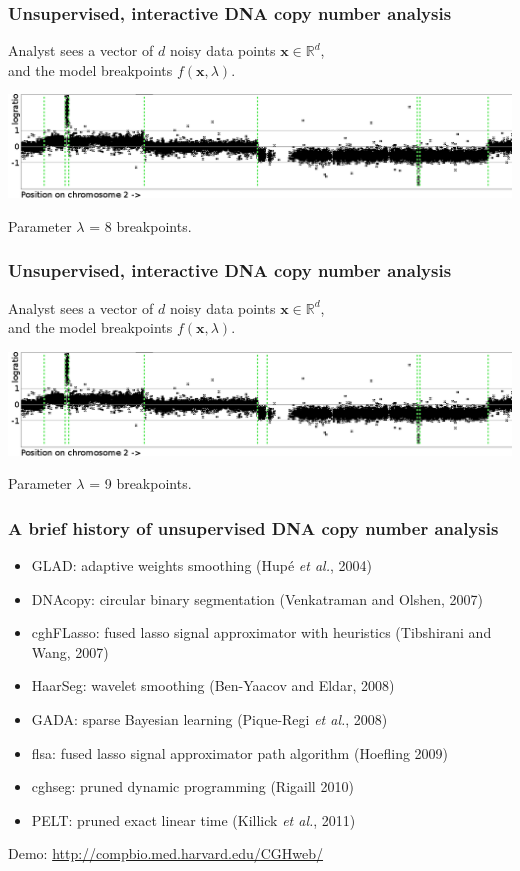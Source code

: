 \documentclass{beamer}
\newcommand{\RR}{\mathbb R}
\begin{document}
\begin{frame}
  \frametitle{Unsupervised, interactive DNA copy number analysis}
  Analyst sees a vector of $d$ noisy data points $\mathbf x\in\RR^d$, \\
  and the model breakpoints $f(\mathbf x, \lambda)$.

  \includegraphics[width=\textwidth]{unlabeled-breakpoints-8}

  Parameter $\lambda$ = 8 breakpoints.
\end{frame}

\begin{frame}
  \frametitle{Unsupervised, interactive DNA copy number analysis}
  Analyst sees a vector of $d$ noisy data points $\mathbf x\in\RR^d$, \\
  and the model breakpoints $f(\mathbf x, \lambda)$.

  \includegraphics[width=\textwidth]{unlabeled-breakpoints-9}

  Parameter $\lambda$ = 9 breakpoints.
\end{frame}

\begin{frame}
  \frametitle{A brief history of unsupervised DNA copy number analysis}
  \begin{itemize}
  \item GLAD: adaptive weights smoothing (Hup\'e \textit{et al.}, 2004)
  \item DNAcopy: circular binary segmentation (Venkatraman and Olshen,
    2007)
  \item cghFLasso: fused lasso signal approximator with heuristics
    (Tibshirani and Wang, 2007)
  \item HaarSeg: wavelet smoothing (Ben-Yaacov and Eldar, 2008)
  \item GADA: sparse Bayesian learning (Pique-Regi \textit{et al.}, 2008)
  \item flsa: fused lasso signal approximator path algorithm (Hoefling 2009)
  \item cghseg: pruned dynamic programming (Rigaill 2010)
  \item PELT: pruned exact linear time (Killick \textit{et al.}, 2011)
  \end{itemize}
  Demo: \url{http://compbio.med.harvard.edu/CGHweb/}
\end{frame}
\end{document}
